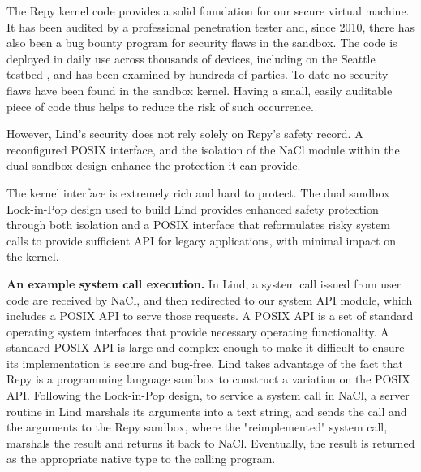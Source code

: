 The Repy kernel code provides a solid foundation for our secure virtual
machine. It has been audited by a professional penetration tester and, since 2010,
there has also been a bug bounty program for security flaws in the sandbox.
The code is deployed in daily use across thousands of devices,
including on the Seattle testbed \cite{seattle}, and has been examined by
hundreds of parties. To date no security flaws have been found in the sandbox
kernel. Having a small, easily auditable piece of code thus helps to reduce the
risk of such occurrence.

However, Lind's security does not rely solely on Repy's
safety record. A reconfigured POSIX interface, and the isolation of
the NaCl module within the dual sandbox design enhance the protection it can
provide.

The kernel interface is extremely rich and hard to protect.
The dual sandbox Lock-in-Pop design used to build Lind provides enhanced
safety protection through both isolation and a POSIX interface that
reformulates risky system calls to
provide sufficient API for legacy applications, with minimal impact on the kernel.

\textbf{An example system call execution.}
In Lind, a system call issued from user code are
received by NaCl, and then redirected to our system API module, which
includes a POSIX API to serve those requests. A POSIX API is a set of standard
operating system interfaces that provide
necessary operating functionality. A standard POSIX API is large and complex
enough to make it difficult to ensure its implementation is secure and bug-free.
Lind takes advantage of the fact that Repy is a programming language sandbox to
construct a variation on the POSIX API. Following the
Lock-in-Pop design, to service a system call in NaCl, a server routine in
Lind marshals its arguments into a text string, and sends the call and the arguments
to the Repy sandbox, where the "reimplemented" system call, marshals the result and
returns it back to NaCl. Eventually, the result is returned as the appropriate
native type to the calling program.

